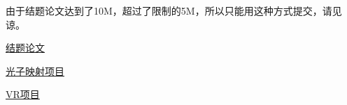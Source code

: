 \documentclass[UTF8]{ctexart}
\begin{document}
    由于结题论文达到了10M，超过了限制的5M，所以只能用这种方式提交，请见谅。

    \href{https://github.com/LRLVEC/FinalPaper/blob/master/%E9%9D%A2%E5%90%91VR%E5%A4%B4%E7%9B%94%E7%9A%84%E5%AE%9E%E6%97%B6%E7%9C%9F%E5%AE%9E%E6%84%9F%E7%BB%98%E5%88%B6%E7%B3%BB%E7%BB%9F.pdf}{结题论文}

    \href{https://github.com/LRLVEC/PhotonMapping}{光子映射项目}
    
    \href{https://github.com/LRLVEC/RTRTGIVR}{VR项目}
\end{document}
